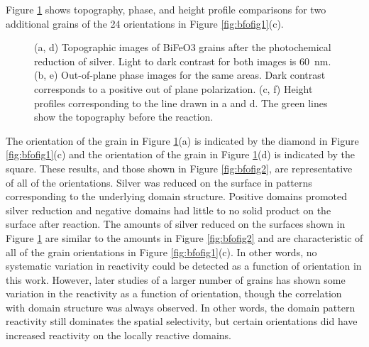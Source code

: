 \documentclass[12pt,%
              twoside,
               letterpaper]{uiothesis}
\begin{document}
Figure \ref{fig:bfofig3} shows  topography,  phase, and height profile
comparisons for two additional grains of the 24 orientations in Figure
\ref{fig:bfofig1}(c).
\begin{figure}
		\caption[Scanning probe data for additional grains]{%
			(a, d) Topographic images of BiFeO3 grains after the 
			photochemical reduction of silver. Light to dark contrast 
			for both images is \SI{60}{\nano\meter}. (b, e) Out-of-plane 
			 phase images for the same areas. Dark contrast corresponds 
			to a positive out of plane polarization. (c, f) Height profiles 
			corresponding to the line drawn in a and d. The green lines 
			show the topography before the reaction.}
		\label{fig:bfofig3}
\end{figure}
The orientation of the grain in Figure \ref{fig:bfofig3}(a) is indicated by the diamond in
Figure \ref{fig:bfofig1}(c) and the orientation of the grain in Figure
\ref{fig:bfofig3}(d) is indicated by the square. These results, and those shown in Figure
\ref{fig:bfofig2}, are representative of all of the orientations. Silver was reduced on
the surface in patterns corresponding to the underlying domain structure. Positive domains
promoted silver reduction and negative domains had little to no solid product on the
surface after reaction. The amounts of silver reduced on the surfaces shown in Figure
\ref{fig:bfofig3} are similar to the amounts in Figure \ref{fig:bfofig2} and are
characteristic of all of the grain orientations in Figure \ref{fig:bfofig1}(c). In other
words, no systematic variation in reactivity could be detected as a function of
orientation in this work. However, later studies of a larger number of grains has shown
some variation in the reactivity as a function of orientation, though the correlation with
domain structure was always observed. In other words, the domain pattern reactivity still
dominates the spatial selectivity, but certain orientations did have increased reactivity
on the locally reactive domains.
\end{document}
